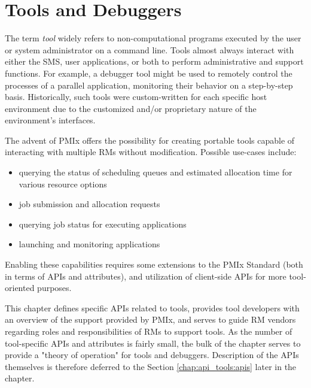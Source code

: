 \chapter{Tools and Debuggers}
\label{chap:api_tools}

The term \textit{tool} widely refers to non-computational programs executed by the user or system administrator on a command line. Tools almost always interact with either the \ac{SMS}, user applications, or both to perform administrative and support functions. For example, a debugger tool might be used to remotely control the processes of a parallel application, monitoring their behavior on a step-by-step basis. Historically, such tools were custom-written for each specific host environment due to the customized and/or proprietary nature of the environment's interfaces.

The advent of \ac{PMIx} offers the possibility for creating portable tools capable of interacting with multiple \acp{RM} without modification. Possible use-cases include:

\begin{itemize}
\item querying the status of scheduling queues and estimated allocation time for various resource options
\item job submission and allocation requests
\item querying job status for executing applications
\item launching and monitoring applications
\end{itemize}

Enabling these capabilities requires some extensions to the \ac{PMIx} Standard (both in terms of \acp{API} and attributes), and utilization of client-side \acp{API} for more tool-oriented purposes.

This chapter defines specific \acp{API} related to tools, provides tool developers with an overview of the support provided by \ac{PMIx}, and serves to guide \ac{RM} vendors regarding roles and responsibilities of \acp{RM} to support tools. As the number of tool-specific \acp{API} and attributes is fairly small, the bulk of the chapter serves to provide a "theory of operation" for tools and debuggers. Description of the \acp{API} themselves is therefore deferred to the Section \ref{chap:api_tools:apis} later in the chapter.

